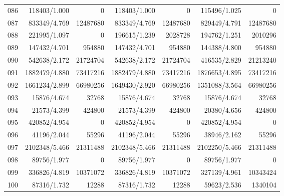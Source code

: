 \begin{longtable}{crrrrrr}
086 & 118403/1.000 & 0 & 118403/1.000 & 0 & 115496/1.025 & 0 \\
087 & 833349/4.769 & 12487680 & 833349/4.769 & 12487680 & 829449/4.791 & 12487680 \\
088 & 221995/1.097 & 0 & 196615/1.239 & 2028728 & 194762/1.251 & 2010296 \\
089 & 147432/4.701 & 954880 & 147432/4.701 & 954880 & 144388/4.800 & 954880 \\
090 & 542638/2.172 & 21724704 & 542638/2.172 & 21724704 & 416535/2.829 & 21213240 \\
091 & 1882479/4.880 & 73417216 & 1882479/4.880 & 73417216 & 1876653/4.895 & 73417216 \\
092 & 1661234/2.899 & 66980256 & 1649430/2.920 & 66980256 & 1351088/3.564 & 66980256 \\
093 & 15876/4.674 & 32768 & 15876/4.674 & 32768 & 15876/4.674 & 32768 \\
094 & 21573/4.399 & 424800 & 21573/4.399 & 424800 & 20380/4.656 & 424800 \\
095 & 420852/4.954 & 0 & 420852/4.954 & 0 & 420852/4.954 & 0 \\
096 & 41196/2.044 & 55296 & 41196/2.044 & 55296 & 38946/2.162 & 55296 \\
097 & 2102348/5.466 & 21311488 & 2102348/5.466 & 21311488 & 2102250/5.466 & 21311488 \\
098 & 89756/1.977 & 0 & 89756/1.977 & 0 & 89756/1.977 & 0 \\
099 & 336826/4.819 & 10371072 & 336826/4.819 & 10371072 & 327139/4.961 & 10343424 \\
100 & 87316/1.732 & 12288 & 87316/1.732 & 12288 & 59623/2.536 & 1340104 \\
\end{longtable}
